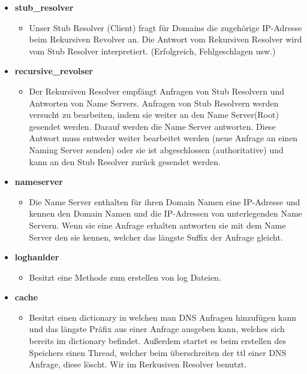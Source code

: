 \begin{itemize}
    \item \textbf{stub\_resolver}
        \begin{itemize}
            \item Unser Stub Resolver (Client) fragt für Domains die zugehörige IP-Adresse beim Rekursiven Revolver an. Die Antwort vom Rekursiven Resolver wird vom Stub Resolver interpretiert. (Erfolgreich, Fehlgeschlagen usw.)
        \end{itemize}
    
    \item \textbf{recursive\_revolser}
        \begin{itemize}
            \item Der Rekursiven Resolver empfängt Anfragen von Stub Resolvern und Antworten von Name Servers. Anfragen von Stub Resolvern werden versucht zu bearbeiten, indem sie weiter an den Name Server(Root) gesendet werden. Darauf werden die Name Server antworten. Diese Antwort muss entweder weiter bearbeitet werden (neue Anfrage an einen Naming Server senden) oder sie ist abgeschlossen (authoritative) und kann an den Stub Resolver zurück gesendet werden.
        \end{itemize}
        
    \item \textbf{nameserver}
        \begin{itemize}
            \item Die Name Server enthalten für ihren Domain Namen eine IP-Adresse und kennen den Domain Namen und die IP-Adressen von unterlegenden Name Servern. Wenn sie eine Anfrage erhalten antworten sie mit dem Name Server den sie kennen, welcher das längste Suffix der Anfrage gleicht. 
        \end{itemize}
    
    \item \textbf{loghanlder}
        \begin{itemize}
            \item Besitzt eine Methode zum erstellen von log Dateien.
        \end{itemize}
    
    \item \textbf{cache}
        \begin{itemize}
            \item Besitzt einen dictionary in welchen man DNS Anfragen hinzufügen kann und das längste Präfix aus einer Anfrage ausgeben kann, welches sich bereits im dictionary befindet. Außerdem startet es beim erstellen des Speichers  einen Thread, welcher beim überschreiten der ttl einer DNS Anfrage, diese löscht. Wir im Rerkusiven Resolver benutzt.
        \end{itemize}
    

\end{itemize}
